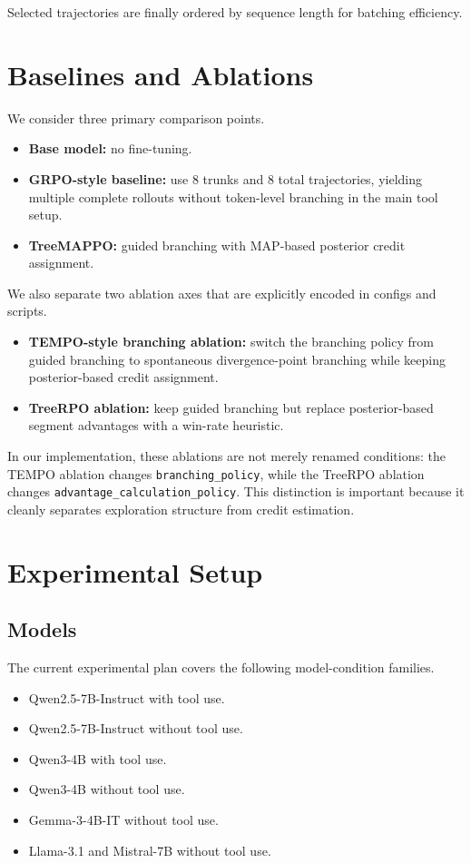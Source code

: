 \documentclass[letterpaper]{article} %
\newcommand{\ours}{TreeMAPPO}
\begin{document}
Selected trajectories are finally ordered by sequence length for batching efficiency.

\section{Baselines and Ablations}
We consider three primary comparison points.
\begin{itemize}
    \item \textbf{Base model:} no fine-tuning.
    \item \textbf{GRPO-style baseline:} use 8 trunks and 8 total trajectories, yielding multiple complete rollouts without token-level branching in the main tool setup.
    \item \textbf{\ours:} guided branching with MAP-based posterior credit assignment.
\end{itemize}

We also separate two ablation axes that are explicitly encoded in configs and scripts.
\begin{itemize}
    \item \textbf{TEMPO-style branching ablation:} switch the branching policy from guided branching to spontaneous divergence-point branching while keeping posterior-based credit assignment.
    \item \textbf{TreeRPO ablation:} keep guided branching but replace posterior-based segment advantages with a win-rate heuristic.
\end{itemize}

In our implementation, these ablations are not merely renamed conditions: the TEMPO ablation changes \texttt{branching\_policy}, while the TreeRPO ablation changes \texttt{advantage\_calculation\_policy}. This distinction is important because it cleanly separates exploration structure from credit estimation.

\section{Experimental Setup}
\subsection{Models}
The current experimental plan covers the following model-condition families.
\begin{itemize}
    \item Qwen2.5-7B-Instruct with tool use.
    \item Qwen2.5-7B-Instruct without tool use.
    \item Qwen3-4B with tool use.
    \item Qwen3-4B without tool use.
    \item Gemma-3-4B-IT without tool use.
    \item Llama-3.1 and Mistral-7B without tool use.
\end{itemize}
\end{document}
